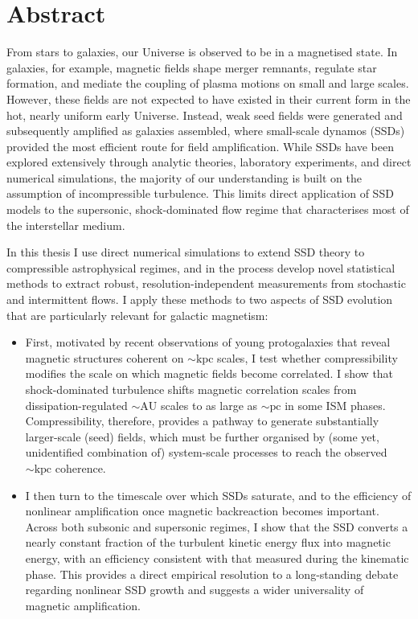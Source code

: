 \chapter*{Abstract}
\vspace{-0.5cm}

From stars to galaxies, our Universe is observed to be in a magnetised state. In galaxies, for example, magnetic fields shape merger remnants, regulate star formation, and mediate the coupling of plasma motions on small and large scales. However, these fields are not expected to have existed in their current form in the hot, nearly uniform early Universe. Instead, weak seed fields were generated and subsequently amplified as galaxies assembled, where small-scale dynamos (SSDs) provided the most efficient route for field amplification. While SSDs have been explored extensively through analytic theories, laboratory experiments, and direct numerical simulations, the majority of our understanding is built on the assumption of incompressible turbulence. This limits direct application of SSD models to the supersonic, shock-dominated flow regime that characterises most of the interstellar medium.

In this thesis I use direct numerical simulations to extend SSD theory to compressible astrophysical regimes, and in the process develop novel statistical methods to extract robust, resolution-independent measurements from stochastic and intermittent flows. I apply these methods to two aspects of SSD evolution that are particularly relevant for galactic magnetism:
\begin{itemize}
    \item First, motivated by recent observations of young protogalaxies that reveal magnetic structures coherent on $\sim \mathrm{kpc}$ scales, I test whether compressibility modifies the scale on which magnetic fields become correlated. I show that shock-dominated turbulence shifts magnetic correlation scales from dissipation-regulated $\sim \mathrm{AU}$ scales to as large as $\sim \mathrm{pc}$ in some ISM phases. Compressibility, therefore, provides a pathway to generate substantially larger-scale (seed) fields, which must be further organised by (some yet, unidentified combination of) system-scale processes to reach the observed $\sim \mathrm{kpc}$ coherence.
    
    \item I then turn to the timescale over which SSDs saturate, and to the efficiency of nonlinear amplification once magnetic backreaction becomes important. Across both subsonic and supersonic regimes, I show that the SSD converts a nearly constant fraction of the turbulent kinetic energy flux into magnetic energy, with an efficiency consistent with that measured during the kinematic phase. This provides a direct empirical resolution to a long-standing debate regarding nonlinear SSD growth and suggests a wider universality of magnetic amplification.
\end{itemize}

